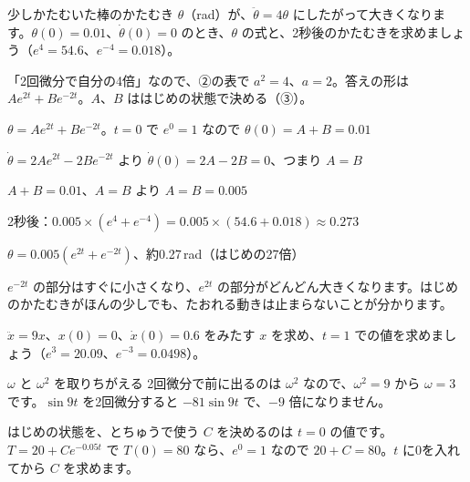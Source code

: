 \begin{reidai}[たおれる動き]
少しかたむいた棒のかたむき $\theta$（rad）が、$\ddot{\theta}=4\theta$ にしたがって大きくなります。$\theta(0)=0.01$、$\dot{\theta}(0)=0$ のとき、$\theta$ の式と、2秒後のかたむきを求めましょう（$e^4=54.6$、$e^{-4}=0.018$）。\par
\kangaekata 「2回微分で自分の4倍」なので、②の表で $a^2=4$、$a=2$。答えの形は $Ae^{2t}+Be^{-2t}$。$A$、$B$ ははじめの状態で決める（③）。\par
\shiki $\theta=Ae^{2t}+Be^{-2t}$。$t=0$ で $e^0=1$ なので $\theta(0)=A+B=0.01$\par
\hspace*{2.6\zw}$\dot{\theta}=2Ae^{2t}-2Be^{-2t}$ より $\dot{\theta}(0)=2A-2B=0$、つまり $A=B$\par
\hspace*{2.6\zw}$A+B=0.01$、$A=B$ より $A=B=0.005$\par
\hspace*{2.6\zw}2秒後：$0.005\times(e^4+e^{-4})=0.005\times(54.6+0.018)\approx0.273$\par
\kotae $\theta=0.005(e^{2t}+e^{-2t})$、約0.27\,rad（はじめの27倍）
\end{reidai}
$e^{-2t}$ の部分はすぐに小さくなり、$e^{2t}$ の部分がどんどん大きくなります。はじめのかたむきがほんの少しでも、たおれる動きは止まらないことが分かります。

\begin{jibun}
$\ddot{x}=9x$、$x(0)=0$、$\dot{x}(0)=0.6$ をみたす $x$ を求め、$t=1$ での値を求めましょう（$e^3=20.09$、$e^{-3}=0.0498$）。
\end{jibun}


\begin{tsumazuki}{$\omega$ と $\omega^2$ を取りちがえる}
2回微分で前に出るのは $\omega^2$ なので、$\omega^2=9$ から $\omega=3$ です。$\sin9t$ を2回微分すると $-81\sin9t$ で、$-9$ 倍になりません。
\end{tsumazuki}

\begin{tsumazuki}{はじめの状態を、とちゅうで使う}
$C$ を決めるのは $t=0$ の値です。$T=20+Ce^{-0.05t}$ で $T(0)=80$ なら、$e^0=1$ なので $20+C=80$。$t$ に0を入れてから $C$ を求めます。
\end{tsumazuki}

